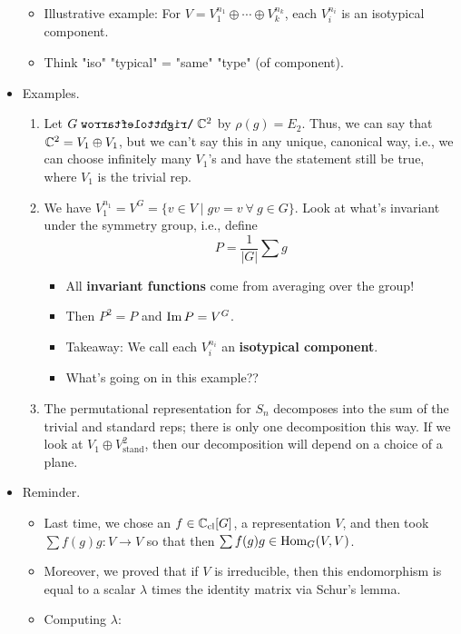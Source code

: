 \documentclass[../notes.tex]{subfiles}
\begin{document}
\begin{itemize}
    \begin{itemize}
        \item Illustrative example: For $V=V_1^{n_1}\oplus\cdots\oplus V_k^{n_k}$, each $V_i^{n_i}$ is an isotypical component.
        \item Think "iso" "typical" = "same" "type" (of component).
    \end{itemize}
    \item Examples.
    \begin{enumerate}
        \item Let $G\acts\C^2$ by $\rho(g)=E_2$. Thus, we can say that $\mathbb{C}^2=V_1\oplus V_1$, but we can't say this in any unique, canonical way, i.e., we can choose infinitely many $V_1$'s and have the statement still be true, where $V_1$ is the trivial rep.
        \item We have $V_1^{n_1}=V^G=\{v\in V\mid gv=v\ \forall\ g\in G\}$. Look at what's invariant under the symmetry group, i.e., define
        \begin{equation*}
            P = \frac{1}{|G|}\sum g
        \end{equation*}
        \begin{itemize}
            \item All \textbf{invariant functions} come from averaging over the group!
            \item Then $P^2=P$ and $\operatorname{Im} P=V^G$.
            \item Takeaway: We call each $V_i^{n_i}$ an \textbf{isotypical component}.
            \item What's going on in this example??
        \end{itemize}
        \item The permutational representation for $S_n$ decomposes into the sum of the trivial and standard reps; there is only one decomposition this way. If we look at $V_1\oplus V_\text{stand}^2$, then our decomposition will depend on a choice of a plane.
    \end{enumerate}
    \item Reminder.
    \begin{itemize}
        \item Last time, we chose an $f\in\mathbb{C}_\text{cl}[G]$, a representation $V$, and then took $\sum f(g)g:V\to V$ so that then $\sum f(g)g\in\operatorname{Hom}_G(V,V)$.
        \item Moreover, we proved that if $V$ is irreducible, then this endomorphism is equal to a scalar $\lambda$ times the identity matrix via Schur's lemma.
        \item Computing $\lambda$:

\end{itemize}
\end{itemize}
\end{document}
